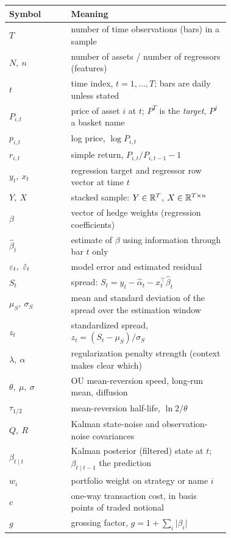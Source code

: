 \begin{center}
\renewcommand{\arraystretch}{1.25}
\begin{tabular}{lp{0.72\linewidth}}
\toprule
Symbol & Meaning \\
\midrule
$T$ & number of time observations (bars) in a sample \\
$N,\ n$ & number of assets / number of regressors (features) \\
$t$ & time index, $t=1,\dots,T$; bars are daily unless stated \\
$P_{i,t}$ & price of asset $i$ at $t$; $P^{T}$ is the \emph{target}, $P^{j}$ a basket name \\
$p_{i,t}$ & log price, $\log P_{i,t}$ \\
$r_{i,t}$ & simple return, $P_{i,t}/P_{i,t-1}-1$ \\
$y_t,\ x_t$ & regression target and regressor row vector at time $t$ \\
$Y,\ X$ & stacked sample: $Y\in\mathbb{R}^{T}$, $X\in\mathbb{R}^{T\times n}$ \\
$\beta$ & vector of hedge weights (regression coefficients) \\
$\hat\beta_t$ & estimate of $\beta$ using information through bar $t$ only \\
$\eps_t,\ \hat\eps_t$ & model error and estimated residual \\
$S_t$ & spread: $S_t = y_t - \hat\alpha_t - x_t^{\top}\hat\beta_t$ \\
$\mu_S,\ \sigma_S$ & mean and standard deviation of the spread over the estimation window \\
$z_t$ & standardized spread, $z_t=(S_t-\mu_S)/\sigma_S$ \\
$\lambda,\ \alpha$ & regularization penalty strength (context makes clear which) \\
$\theta,\ \mu,\ \sigma$ & OU mean-reversion speed, long-run mean, diffusion \\
$\tau_{1/2}$ & mean-reversion half-life, $\ln 2/\theta$ \\
$Q,\ R$ & Kalman state-noise and observation-noise covariances \\
$\beta_{t\mid t}$ & Kalman posterior (filtered) state at $t$; $\beta_{t\mid t-1}$ the prediction \\
$w_i$ & portfolio weight on strategy or name $i$ \\
$c$ & one-way transaction cost, in basis points of traded notional \\
$g$ & grossing factor, $g = 1 + \sum_i \lvert \beta_i\rvert$ \\

\end{tabular}
\end{center}
